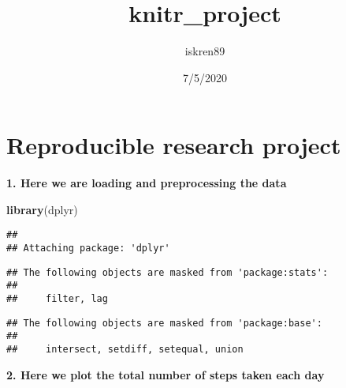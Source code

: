 \documentclass[]{article}
\title{knitr\_project}
\author{iskren89}
\date{7/5/2020}
\newenvironment{Shaded}{\begin{snugshade}}{\end{snugshade}}
\newcommand{\DecValTok}[1]{\textcolor[rgb]{0.00,0.00,0.81}{#1}}
\newcommand{\KeywordTok}[1]{\textcolor[rgb]{0.13,0.29,0.53}{\textbf{#1}}}
\newcommand{\NormalTok}[1]{#1}
\newcommand{\OperatorTok}[1]{\textcolor[rgb]{0.81,0.36,0.00}{\textbf{#1}}}
\newcommand{\StringTok}[1]{\textcolor[rgb]{0.31,0.60,0.02}{#1}}
\begin{document}
\maketitle

\hypertarget{reproducible-research-project}{%
\section{Reproducible research
project}\label{reproducible-research-project}}

\textbf{1. Here we are loading and preprocessing the data}

\begin{Shaded}
\begin{Highlighting}[]
\KeywordTok{library}\NormalTok{(dplyr)}
\end{Highlighting}
\end{Shaded}

\begin{verbatim}
## 
## Attaching package: 'dplyr'
\end{verbatim}

\begin{verbatim}
## The following objects are masked from 'package:stats':
## 
##     filter, lag
\end{verbatim}

\begin{verbatim}
## The following objects are masked from 'package:base':
## 
##     intersect, setdiff, setequal, union
\end{verbatim}

\begin{Shaded}
\end{Shaded}

\textbf{2. Here we plot the total number of steps taken each day}
\end{document}
